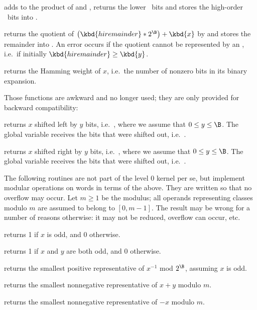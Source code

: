  adds  to the product
of  and , returns the lower \B\ bits and stores the high-order
\B\ bits into .

 returns the quotient of
$  \left(\kbd{hiremainder} * 2^{\B}\right) + \kbd{x} $
by  and stores the remainder into . An error occurs
if the quotient cannot be represented by an , i.e.~if initially
$\kbd{hiremainder}\ge\kbd{y}$.

 returns the Hamming weight of $x$, i.e.~the
number of nonzero bits in its binary expansion.

 Those functions are awkward and no longer used;
they are only provided for backward compatibility:

 returns $x$ shifted left by $y$ bits,
i.e.~, where we assume that $0\leq y\leq\B$. The global variable
 receives the bits that were shifted out,
i.e.~.

 returns $x$ shifted right by $y$ bits,
i.e.~, where we assume that $0\leq y\leq\B$. The global variable
 receives the bits that were shifted out,
i.e.~.

The following routines are not part of the level 0 kernel per se, but
implement modular operations on words in terms of the above. They are written
so that no overflow may occur. Let $m \geq 1$ be the modulus; all operands
representing classes modulo $m$ are assumed to belong to $[0,m-1]$. The
result may be wrong for a number of reasons otherwise: it may not be reduced,
overflow can occur, etc.

 returns 1 if $x$ is odd, and 0 otherwise.

 returns 1 if $x$ and $y$ are both odd,
and 0 otherwise.

 returns the smallest
positive representative of $x^{-1}$ mod $2^\B$, assuming $x$ is odd.

 returns the smallest
nonnegative representative of $x + y$ modulo $m$.

 returns the smallest
nonnegative representative of $-x$ modulo $m$.

